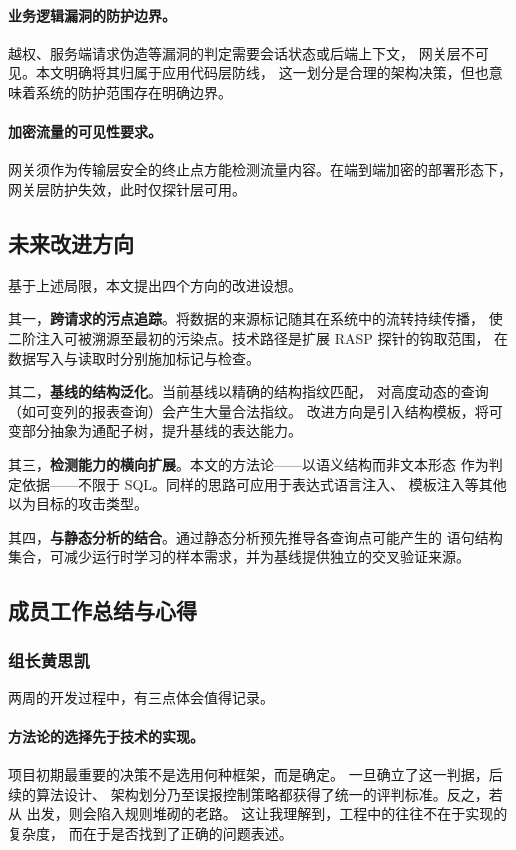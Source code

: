 \paragraph{业务逻辑漏洞的防护边界。}
越权、服务端请求伪造等漏洞的判定需要会话状态或后端上下文，
网关层不可见。本文明确将其归属于应用代码层防线，
这一划分是合理的架构决策，但也意味着系统的防护范围存在明确边界。

\paragraph{加密流量的可见性要求。}
网关须作为传输层安全的终止点方能检测流量内容。在端到端加密的部署形态下，
网关层防护失效，此时仅探针层可用。

\subsection{未来改进方向}

基于上述局限，本文提出四个方向的改进设想。

其一，\textbf{跨请求的污点追踪}。将数据的来源标记随其在系统中的流转持续传播，
使二阶注入可被溯源至最初的污染点。技术路径是扩展 RASP 探针的钩取范围，
在数据写入与读取时分别施加标记与检查。

其二，\textbf{基线的结构泛化}。当前基线以精确的结构指纹匹配，
对高度动态的查询（如可变列的报表查询）会产生大量合法指纹。
改进方向是引入结构模板，将可变部分抽象为通配子树，提升基线的表达能力。

其三，\textbf{检测能力的横向扩展}。本文的方法论——以语义结构而非文本形态
作为判定依据——不限于 SQL。同样的思路可应用于表达式语言注入、
模板注入等其他以为目标的攻击类型。

其四，\textbf{与静态分析的结合}。通过静态分析预先推导各查询点可能产生的
语句结构集合，可减少运行时学习的样本需求，并为基线提供独立的交叉验证来源。

\subsection{成员工作总结与心得}

\subsubsection{组长\quad 黄思凯}

两周的开发过程中，有三点体会值得记录。

\paragraph{方法论的选择先于技术的实现。}
项目初期最重要的决策不是选用何种框架，而是确定。
一旦确立了这一判据，后续的算法设计、
架构划分乃至误报控制策略都获得了统一的评判标准。反之，若从
出发，则会陷入规则堆砌的老路。
这让我理解到，工程中的往往不在于实现的复杂度，
而在于是否找到了正确的问题表述。

